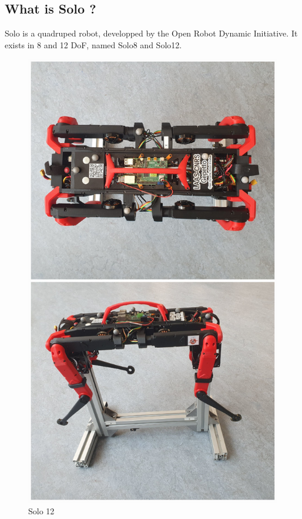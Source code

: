\documentclass[a4paper,10pt]{article}
\begin{document}
\subsection{What is Solo ?}
\label{explanation_solo}
Solo is a quadruped robot, developped by the Open Robot Dynamic Initiative. It exists in 8 and 12 DoF, named Solo8 and Solo12.
\begin{figure}[H]
\centering
  \includegraphics[width=\linewidth, angle=0, scale=0.5]{./images/Solo3.jpg}
  \caption{Solo 12}
\end{figure}
\end{document}
